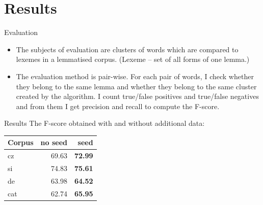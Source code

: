\documentclass[hyperref={pdfencoding=unicode, unicode=true}, xcolor=dvipsnames]{beamer}
\begin{document}
\section{Results}

\begin{frame}{Evaluation}
\begin{itemize}
\item The subjects of evaluation are clusters of words which are compared to lexemes in a lemmatised corpus. (Lexeme -- set of all forms of one lemma.)
\item The evaluation method is pair-wise. For each pair of words, I check whether they belong to the same lemma and whether they belong to the same cluster created by the algorithm. I count true/false positives and true/false negatives and from them I get precision and recall to compute the F-score.
\end{itemize}
\end{frame}

\begin{frame}{Results}
The F-score obtained with and without additional data:

\begin{center}
\begin{tabular}{lrr}
\toprule
\bf Corpus & \bf no seed & \bf seed \\
\midrule
cz  & 69.63 & \bf 72.99 \\
si  & 74.83 & \bf 75.61 \\
de  & 63.98 & \bf 64.52 \\
cat & 62.74 & \bf 65.95 \\
\bottomrule
\end{tabular}
\end{center}
\end{frame}

%

%
%
%
%
%
\end{document}
